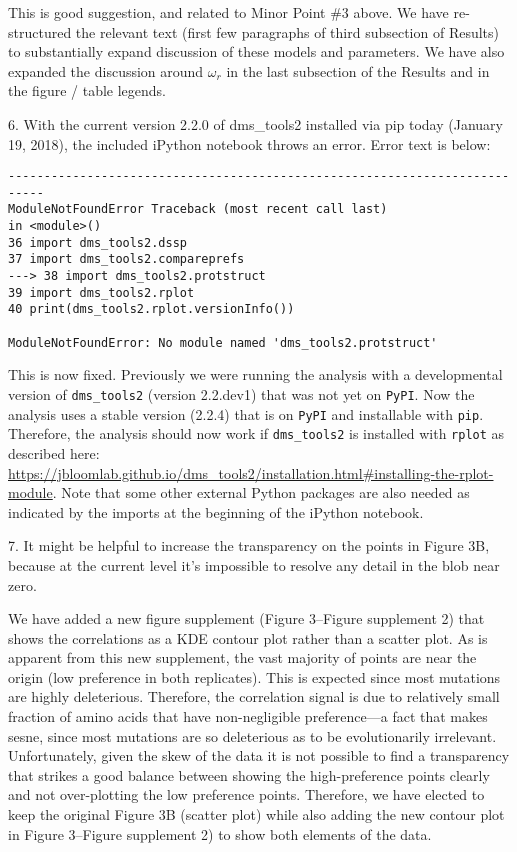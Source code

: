 \documentclass[11pt, oneside]{article}   	%
\begin{document}
{\color{black}
This is good suggestion, and related to Minor Point \#3 above.
We have re-structured the relevant text (first few paragraphs of third subsection of Results) to substantially expand discussion of these models and parameters.
We have also expanded the discussion around $\omega_r$ in the last subsection of the Results and in the figure / table legends.}

6. With the current version 2.2.0 of dms\_tools2 installed via pip today (January 19, 2018), the included iPython notebook throws an error. Error text is below: 
\begin{verbatim}
--------------------------------------------------------------------------- 
ModuleNotFoundError Traceback (most recent call last) 
in <module>() 
36 import dms_tools2.dssp 
37 import dms_tools2.compareprefs 
---> 38 import dms_tools2.protstruct 
39 import dms_tools2.rplot 
40 print(dms_tools2.rplot.versionInfo()) 

ModuleNotFoundError: No module named 'dms_tools2.protstruct'
\end{verbatim}

{\color{black}
This is now fixed.
Previously we were running the analysis with a developmental version of \texttt{dms\_tools2} (version 2.2.dev1) that was not yet on \texttt{PyPI}.
Now the analysis uses a stable version (2.2.4) that is on \texttt{PyPI} and installable with \texttt{pip}.
Therefore, the analysis should now work if \texttt{dms\_tools2} is installed with \texttt{rplot} as described here: \url{https://jbloomlab.github.io/dms_tools2/installation.html#installing-the-rplot-module}.
Note that some other external Python packages are also needed as indicated by the imports at the beginning of the iPython notebook.
}

7. It might be helpful to increase the transparency on the points in Figure 3B, because at the current level it's impossible to resolve any detail in the blob near zero. 

{\color{black}
We have added a new figure supplement (Figure 3--Figure supplement 2) that shows the correlations as a KDE contour plot rather than a scatter plot.
As is apparent from this new supplement, the vast majority of points are near the origin (low preference in both replicates). 
This is expected since most mutations are highly deleterious.
Therefore, the correlation signal is due to relatively small fraction of amino acids that have non-negligible preference---a fact that makes sesne, since most mutations are so deleterious as to be evolutionarily irrelevant.
Unfortunately, given the skew of the data it is not possible to find a transparency that strikes a good balance between showing the high-preference points clearly and not over-plotting the low preference points.
Therefore, we have elected to keep the original Figure 3B (scatter plot) while also adding the new contour plot in Figure 3--Figure supplement 2) to show both elements of the data.
}
\end{document}
